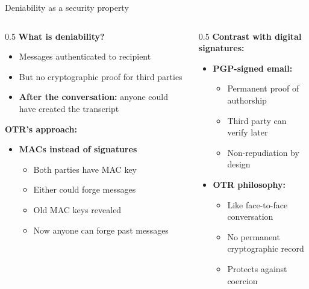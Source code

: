 \ifdefined\PRESENTATION\else\PassOptionsToClass{handout}{beamer}\fi\documentclass[aspectratio=169, lualatex]{beamer}
\begin{document}
\begin{frame}{Deniability as a security property}
	\begin{columns}[c]
		\begin{column}{0.5\textwidth}
			\textbf{What is deniability?}
			\begin{itemize}
				\item Messages authenticated to recipient
				\item But no cryptographic proof for third parties
				\item \textbf{After the conversation:} anyone could have created the transcript
			\end{itemize}
			\textbf{OTR's approach:}
			\begin{itemize}
				\item \textbf{MACs instead of signatures}
				      \begin{itemize}
					      \item Both parties have MAC key
					      \item Either could forge messages
					      \item Old MAC keys revealed
					      \item Now anyone can forge past messages
				      \end{itemize}
			\end{itemize}
		\end{column}
		\begin{column}{0.5\textwidth}
			\textbf{Contrast with digital signatures:}
			\begin{itemize}
				\item \textbf{PGP-signed email:}
				      \begin{itemize}
					      \item Permanent proof of authorship
					      \item Third party can verify later
					      \item Non-repudiation by design
				      \end{itemize}
				\item \textbf{OTR philosophy:}
				      \begin{itemize}
					      \item Like face-to-face conversation
					      \item No permanent cryptographic record
					      \item Protects against coercion
				      \end{itemize}
			\end{itemize}
		\end{column}
	\end{columns}
\end{frame}
\end{document}
